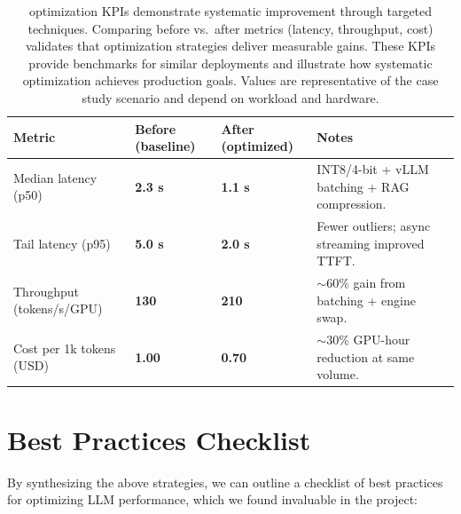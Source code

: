 \begin{table}[tb]
\centering
\small
\caption{\ishtar{} optimization KPIs demonstrate systematic improvement through targeted techniques. Comparing before vs.\ after metrics (latency, throughput, cost) validates that optimization strategies deliver measurable gains. These KPIs provide benchmarks for similar deployments and illustrate how systematic optimization achieves production goals. Values are representative of the case study scenario and depend on workload and hardware.}
\label{tab:ch07_ishtar_kpis}
\setlength{\tabcolsep}{6pt}
\renewcommand{\arraystretch}{1.3}
\begin{tabularx}{0.95\linewidth}{@{}l
  >{\raggedleft\arraybackslash}p{2.6cm}
  >{\raggedleft\arraybackslash}p{2.6cm}
  >{\raggedright\arraybackslash}X@{}}
\toprule
\rowcolor{gray!15}
\textbf{Metric} & \textbf{Before (baseline)} & \textbf{After (optimized)} & \textbf{Notes} \\
\midrule
Median latency (p50)     & \textcolor{orange!70!black}{\textbf{2.3 s}}  & \textcolor{green!70!black}{\textbf{1.1 s}}  & INT8/4-bit + vLLM batching + RAG compression. \\
Tail latency (p95)       & \textcolor{orange!70!black}{\textbf{5.0 s}}  & \textcolor{green!70!black}{\textbf{2.0 s}}  & Fewer outliers; async streaming improved TTFT. \\
Throughput (tokens/s/GPU)& \textcolor{orange!70!black}{\textbf{130}}    & \textcolor{green!70!black}{\textbf{210}}    & $\sim$60\% gain from batching + engine swap. \\
Cost per 1k tokens (USD) & \textcolor{orange!70!black}{\textbf{1.00}}   & \textcolor{green!70!black}{\textbf{0.70}}   & $\sim$30\% GPU-hour reduction at same volume. \\
\bottomrule
\end{tabularx}
\end{table}

\section{Best Practices Checklist}
\label{sec:perf-checklist}

By synthesizing the above strategies, we can outline a checklist of best practices for optimizing LLM performance, which we found invaluable in the \ishtar{} project:

